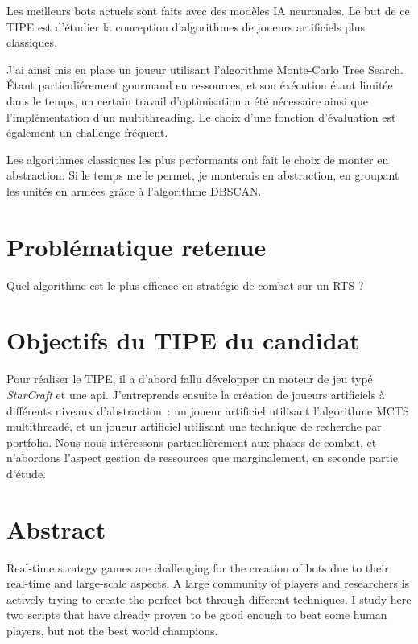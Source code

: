 \documentclass[a4paper, 11pt]{article}
\begin{document}
Les meilleurs bots actuels sont faits avec des modèles IA neuronales.
Le but de ce TIPE est d'étudier la conception d'algorithmes de joueurs artificiels plus classiques.

J'ai ainsi mis en place un joueur utilisant l'algorithme Monte-Carlo Tree Search.
Étant particuliérement gourmand en ressources, et son éxécution étant limitée dans le temps,
un certain travail d'optimisation a été nécessaire ainsi que l'implémentation d'un multithreading.
Le choix d'une fonction d'évaluation est également un challenge fréquent.\cite{MCTSRTS}\cite{MCTStactical}

Les algorithmes classiques les plus performants ont fait le choix de monter en abstraction.
Si le temps me le permet, je monterais en abstraction, en groupant les unités en armées grâce à l'algorithme DBSCAN.
\cite{dbscan}\cite{combatmodel}


\section*{Problématique retenue}
Quel algorithme est le plus efficace en stratégie de combat sur un RTS ?

\section*{Objectifs du TIPE du candidat}
Pour réaliser le TIPE, il a d'abord fallu développer un moteur de jeu typé \emph{StarCraft} et une api.
J'entreprends ensuite la création de joueurs artificiels à différents niveaux d'abstraction :
un joueur artificiel utilisant l'algorithme MCTS multithreadé, et un joueur artificiel utilisant une technique de recherche par portfolio.
Nous nous intéressons particulièrement aux phases de combat, et n'abordons l'aspect gestion de ressources que marginalement, en seconde partie d'étude.

\section*{Abstract}

Real-time strategy games are challenging for the creation of bots due to their real-time and large-scale aspects.
A large community of players and researchers is actively trying to create the perfect bot through different techniques.
I study here two scripts that have already proven to be good enough to beat some human players, but not the best world champions.



\end{document}
